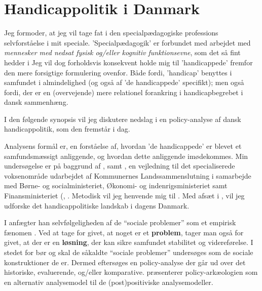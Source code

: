 \section{Handicappolitik i Danmark}

Jeg formoder, at jeg vil tage fat i den specialpædagogiske professions selvforståelse i mit speciale.
'Specialpædagogik' er forbundet med arbejdet med \textit{mennesker med nedsat fysisk og/eller kognitiv funktionsevne}, som det så fint hedder i 
Jeg vil dog forholdsvis konsekvent holde mig til 'handicappede' fremfor den mere forsigtige formulering ovenfor.
Både fordi, 'handicap' benyttes i samfundet i almindelighed (og også af 'de handicappede' specifikt); men også fordi, der er en (overvejende) mere relationel forankring i handicapbegrebet i dansk sammenhæng.

I den følgende synopsis vil jeg diskutere nedslag i en policy-analyse af dansk handicappolitik, som den fremstår i dag.

Analysens formål er, en forståelse af, hvordan 'de handicappede' er blevet et samfundsmæssigt anliggende, og hvordan dette anliggende imødekommes.
Min undersøgelse er på baggrund af , samt , en vejledning til det specialiserede voksenområde udarbejdet af Kommunernes Landssammenslutning i samarbejde med Børne- og socialministeriet, Økonomi- og indenrigsministeriet samt Finansministeriet (\cite{borne-ogsocialministerietBekendtgorelseAfLov2018}, \cite{klStyringAfDet2017}.
 Metodisk vil jeg henvende mig til \citeauthor{scheurichPolicyArchaeologyNew1994}.
Med afsæt i , vil jeg udforske det handicappolitiske landskab i dagens Danmark.

I  anfægter han selvfølgeligheden af de “sociale problemer” som et empirisk fænomen \autocite{scheurichPolicyArchaeologyNew1994}.
Ved at tage for givet, at noget er et \textbf{problem}, tager man også for givet, at der er en \textbf{løsning}, der kan sikre samfundet stabilitet og videreførelse.
I stedet for bør og skal de såkaldte “sociale problemer” undersøges som de sociale konstruktioner de er.
Dermed eftersøges en policy-analyse der går ud over det historiske, evaluerende, og/eller komparative.
\citeauthor{scheurichPolicyArchaeologyNew1994} præsenterer policy-arkæologien som en alternativ analysemodel til de (post)positiviske analysemodeller.

